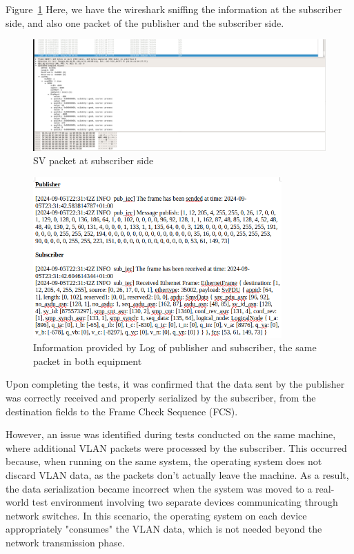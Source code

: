 Figure~\ref{fig:subscriber_side} Here, we have the wireshark sniffing the information at the subscriber side, and also one packet of the publisher and the subscriber side.

\begin{figure}[tbh!]
	\centering
	\includegraphics[width=1.00\textwidth, keepaspectratio]{ch6/assets/subscriber_side.png} %
	\caption{SV packet at subscriber side}
	\label{fig:subscriber_side}
\end{figure}

\begin{figure}[tbh!]
	\centering
	\includegraphics[width=0.85\textwidth, keepaspectratio]{ch6/assets/information_packet_sub_pub.png} %
	\caption{Information provided by Log of publisher and subscriber, the same packet in both equipment}
	\label{fig:information_packet_sub_pub}
\end{figure}

Upon completing the tests, it was confirmed that the data sent by the publisher was correctly received and properly serialized by the subscriber, from the destination fields to the Frame Check Sequence (FCS).

However, an issue was identified during tests conducted on the same machine, where additional VLAN packets were processed by the subscriber. This occurred because, when running on the same system, the operating system does not discard VLAN data, as the packets don’t actually leave the machine. As a result, the data serialization became incorrect when the system was moved to a real-world test environment involving two separate devices communicating through network switches. In this scenario, the operating system on each device appropriately "consumes" the VLAN data, which is not needed beyond the network transmission phase.

